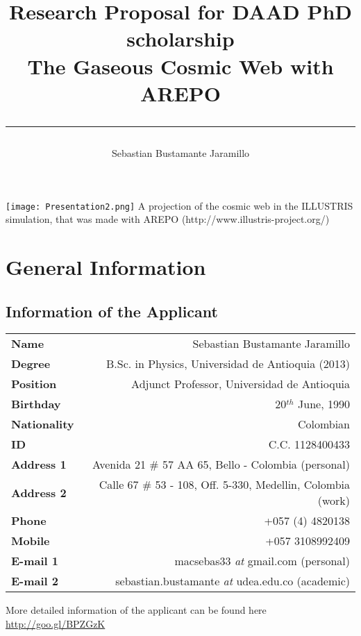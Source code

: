 \documentclass[a4,useAMS,usenatbib,usegraphicx,12pt]{article}
\title{{\textbf{Research Proposal for DAAD PhD scholarship}}\\ The Gaseous Cosmic Web with AREPO\\ \color{black}\rule{15cm}{0.5mm}}
\author{Sebastian Bustamante Jaramillo}
\date{}
\begin{document}
\maketitle
\begin{center}
\texttt{[image: Presentation2.png]}
\tiny{A projection of the cosmic web in the ILLUSTRIS simulation, that was made 
with AREPO (http://www.illustris-project.org/)}
\end{center}
\tableofcontents
 
\newpage 

\section{General Information}
\small
\subsection*{Information of the Applicant}
\begin{tabular}{L!{\VRule}R}
\bf Name		& Sebastian Bustamante Jaramillo\\
\bf Degree		& B.Sc. in Physics, Universidad de Antioquia (2013)\\
\bf Position	& Adjunct Professor, Universidad de Antioquia\\
\bf Birthday	& { 20$^{th}$ June, 1990}\\
\bf Nationality & Colombian\\
\bf ID			& C.C. 1128400433\\
\bf Address 1	& Avenida 21 \# 57 AA 65, Bello - Colombia (personal)\\
\bf Address 2	& Calle 67 \# 53 - 108, Off. 5-330, Medellin, Colombia (work)\\
\bf Phone		& +057 (4) 4820138\\
\bf Mobile		& +057 3108992409\\
\bf E-mail 1	& macsebas33 \textit{at} gmail.com (personal)\\
\bf E-mail 2	& sebastian.bustamante \textit{at} udea.edu.co (academic)\\
\end{tabular}

\vspace{10pt}

More detailed information of the applicant can be found here \url{http://goo.gl/BPZGzK}

\vspace{15pt}  
\end{document}
